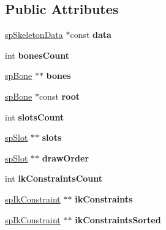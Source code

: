 \subsection*{Public Attributes}
\begin{DoxyCompactItemize}
\item 
\mbox{\label{structspSkeleton_ae1fa89c705e13a05cf182e6ca7af0c57}} 
\hyperlink{structspSkeletonData}{sp\+Skeleton\+Data} $\ast$const {\bfseries data}
\item 
\mbox{\label{structspSkeleton_aeab8781767ddef591d88081b4660438f}} 
int {\bfseries bones\+Count}
\item 
\mbox{\label{structspSkeleton_a7e7a73c4b6ddd07b673389de86811f77}} 
\hyperlink{structspBone}{sp\+Bone} $\ast$$\ast$ {\bfseries bones}
\item 
\mbox{\label{structspSkeleton_a13be360b251255465db2ac9b13220a54}} 
\hyperlink{structspBone}{sp\+Bone} $\ast$const {\bfseries root}
\item 
\mbox{\label{structspSkeleton_a0ead79cc99ee78e8175815f5dbd9efa2}} 
int {\bfseries slots\+Count}
\item 
\mbox{\label{structspSkeleton_a475819433029b7f31f0925cf6cb0d8e7}} 
\hyperlink{structspSlot}{sp\+Slot} $\ast$$\ast$ {\bfseries slots}
\item 
\mbox{\label{structspSkeleton_ae239e6f395b975cb4c5c9c62992e970e}} 
\hyperlink{structspSlot}{sp\+Slot} $\ast$$\ast$ {\bfseries draw\+Order}
\item 
\mbox{\label{structspSkeleton_a66e17017ae3e37733fb51f7a4618b52a}} 
int {\bfseries ik\+Constraints\+Count}
\item 
\mbox{\label{structspSkeleton_aafaff06b6051193aa7d51294636bf5bf}} 
\hyperlink{structspIkConstraint}{sp\+Ik\+Constraint} $\ast$$\ast$ {\bfseries ik\+Constraints}
\item 
\mbox{\label{structspSkeleton_a57899faa2271145ac7aee66c8a0343fb}} 
\hyperlink{structspIkConstraint}{sp\+Ik\+Constraint} $\ast$$\ast$ {\bfseries ik\+Constraints\+Sorted}
$$
\end{DoxyCompactItemize}
